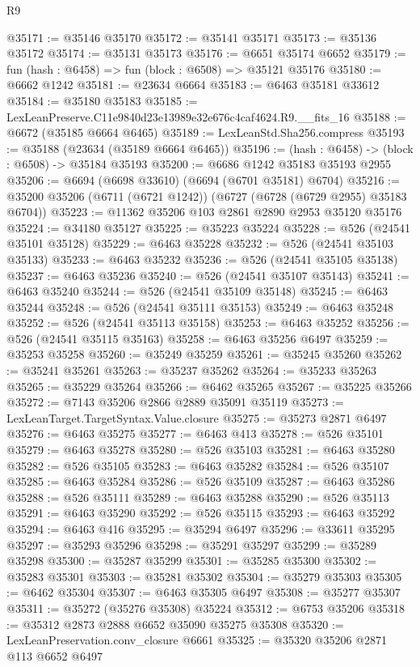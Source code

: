 \begin{lexlean}{R9}
\begin{coremodule}
@35171 := @35146 @35170
@35172 := @35141 @35171
@35173 := @35136 @35172
@35174 := @35131 @35173
@35176 := @6651 @35174 @6652
@35179 := fun (hash : @6458) => fun (block : @6508) => @35121 @35176
@35180 := @6662 @1242
@35181 := @23634 @6664
@35183 := @6463 @35181 @33612
@35184 := @35180 @35183
@35185 := LexLeanPreserve.C11e9840d23e13989e32e676c4caf4624.R9.__fits_16
@35188 := @6672 (@35185 @6664 @6465)
@35189 := LexLeanStd.Sha256.compress
@35193 := @35188 (@23634 (@35189 @6664 @6465))
@35196 := (hash : @6458) -> (block : @6508) -> @35184 @35193
@35200 := @6686 @1242 @35183 @35193 @2955
@35206 := @6694 (@6698 @33610) (@6694 (@6701 @35181) @6704)
@35216 := @35200 @35206 (@6711 (@6721 @1242)) (@6727 (@6728 (@6729 @2955) @35183 @6704))
@35223 := @11362 @35206 @103 @2861 @2890 @2953 @35120 @35176
@35224 := @34180 @35127
@35225 := @35223 @35224
@35228 := @526 (@24541 @35101 @35128)
@35229 := @6463 @35228
@35232 := @526 (@24541 @35103 @35133)
@35233 := @6463 @35232
@35236 := @526 (@24541 @35105 @35138)
@35237 := @6463 @35236
@35240 := @526 (@24541 @35107 @35143)
@35241 := @6463 @35240
@35244 := @526 (@24541 @35109 @35148)
@35245 := @6463 @35244
@35248 := @526 (@24541 @35111 @35153)
@35249 := @6463 @35248
@35252 := @526 (@24541 @35113 @35158)
@35253 := @6463 @35252
@35256 := @526 (@24541 @35115 @35163)
@35258 := @6463 @35256 @6497
@35259 := @35253 @35258
@35260 := @35249 @35259
@35261 := @35245 @35260
@35262 := @35241 @35261
@35263 := @35237 @35262
@35264 := @35233 @35263
@35265 := @35229 @35264
@35266 := @6462 @35265
@35267 := @35225 @35266
@35272 := @7143 @35206 @2866 @2889 @35091 @35119
@35273 := LexLeanTarget.TargetSyntax.Value.closure
@35275 := @35273 @2871 @6497
@35276 := @6463 @35275
@35277 := @6463 @413
@35278 := @526 @35101
@35279 := @6463 @35278
@35280 := @526 @35103
@35281 := @6463 @35280
@35282 := @526 @35105
@35283 := @6463 @35282
@35284 := @526 @35107
@35285 := @6463 @35284
@35286 := @526 @35109
@35287 := @6463 @35286
@35288 := @526 @35111
@35289 := @6463 @35288
@35290 := @526 @35113
@35291 := @6463 @35290
@35292 := @526 @35115
@35293 := @6463 @35292
@35294 := @6463 @416
@35295 := @35294 @6497
@35296 := @33611 @35295
@35297 := @35293 @35296
@35298 := @35291 @35297
@35299 := @35289 @35298
@35300 := @35287 @35299
@35301 := @35285 @35300
@35302 := @35283 @35301
@35303 := @35281 @35302
@35304 := @35279 @35303
@35305 := @6462 @35304
@35307 := @6463 @35305 @6497
@35308 := @35277 @35307
@35311 := @35272 (@35276 @35308) @35224
@35312 := @6753 @35206
@35318 := @35312 @2873 @2888 @6652 @35090 @35275 @35308
@35320 := LexLeanPreservation.conv_closure @6661
@35325 := @35320 @35206 @2871 @113 @6652 @6497

\end{coremodule}
\end{lexlean}
